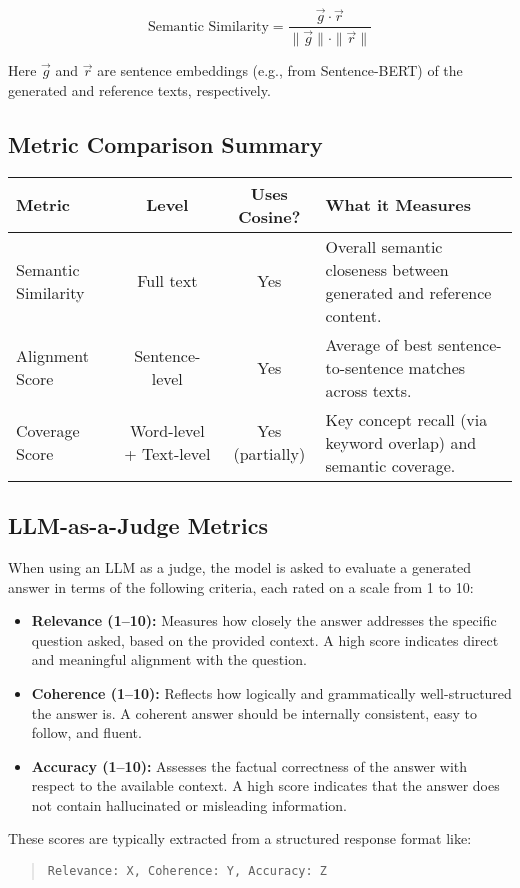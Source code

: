 \documentclass[12pt]{article}
\begin{document}
\[
\text{Semantic Similarity} = \frac{\vec{g} \cdot \vec{r}}{\|\vec{g}\| \cdot \|\vec{r}\|}
\]

Here \( \vec{g} \) and \( \vec{r} \) are sentence embeddings (e.g., from Sentence-BERT) of the generated and reference texts, respectively.

\subsection*{Metric Comparison Summary}

\begin{center}
\begin{tabular}{|l|c|c|p{6cm}|}
\hline
\textbf{Metric} & \textbf{Level} & \textbf{Uses Cosine?} & \textbf{What it Measures} \\
\hline
Semantic Similarity & Full text & Yes & Overall semantic closeness between generated and reference content. \\
\hline
Alignment Score & Sentence-level & Yes & Average of best sentence-to-sentence matches across texts. \\
\hline
Coverage Score & Word-level + Text-level & Yes (partially) & Key concept recall (via keyword overlap) and semantic coverage. \\
\hline
\end{tabular}
\end{center}

\subsection*{LLM-as-a-Judge Metrics}

When using an LLM as a judge, the model is asked to evaluate a generated answer in terms of the following criteria, each rated on a scale from 1 to 10:

\begin{itemize}
    \item \textbf{Relevance (1--10):} Measures how closely the answer addresses the specific question asked, based on the provided context. A high score indicates direct and meaningful alignment with the question.
    
    \item \textbf{Coherence (1--10):} Reflects how logically and grammatically well-structured the answer is. A coherent answer should be internally consistent, easy to follow, and fluent.
    
    \item \textbf{Accuracy (1--10):} Assesses the factual correctness of the answer with respect to the available context. A high score indicates that the answer does not contain hallucinated or misleading information.
\end{itemize}

These scores are typically extracted from a structured response format like:

\begin{quote}
\texttt{Relevance: X, Coherence: Y, Accuracy: Z}
\end{quote}
\end{document}
